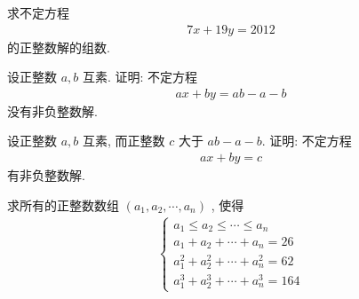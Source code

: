 \documentclass[aspectratio=169]{ctexbeamer}
\theoremstyle{definition}
\begin{document}
\setcounter{theorem}{0}
\begin{frame}[t]
	\begin{example}
		求不定方程
		\begin{align}\label{eq:一次不定方程-例1-1}
			7 x+19 y=2012
		\end{align}
		的正整数解的组数.
	\end{example}
\end{frame}

\begin{frame}[t]
	\begin{example}
		设正整数 $a ,  b$ 互素. 证明: 不定方程
		\begin{align}\label{eq:一次不定方程-例2-1}
			a x+b y=a b-a-b
		\end{align}
		没有非负整数解.
	\end{example}
\end{frame}

\begin{frame}[t]
	\begin{example}
		设正整数 $a ,  b$ 互素, 而正整数 $c$ 大于 $a b-a-b$. 证明: 不定方程
		\begin{align}\label{eq:一次不定方程-例3-1}
			a x+b y=c
		\end{align}
		有非负整数解.
	\end{example}
\end{frame}

\begin{comment}
\begin{frame}[t]
	\begin{example}
		求不定方程
		\begin{align*}
			x+2 y+3 z=2012
		\end{align*}
		的正整数解的组数.
	\end{example}
\end{frame}
\end{comment}

\begin{frame}[t]
	\begin{example}
		求所有的正整数数组 $\left(a_{1}, a_{2}, \cdots, a_{n}\right)$ , 使得
		\begin{align*}
			\left\{\begin{array}{l}
				       a_{1} \leqslant a_{2} \leqslant \cdots \leqslant a_{n} \\
				       a_{1}+a_{2}+\cdots+a_{n}=26                            \\
				       a_{1}^{2}+a_{2}^{2}+\cdots+a_{n}^{2}=62                \\
				       a_{1}^{3}+a_{2}^{3}+\cdots+a_{n}^{3}=164
			       \end{array}\right.
		\end{align*}
	\end{example}
\end{frame}
\end{document}
